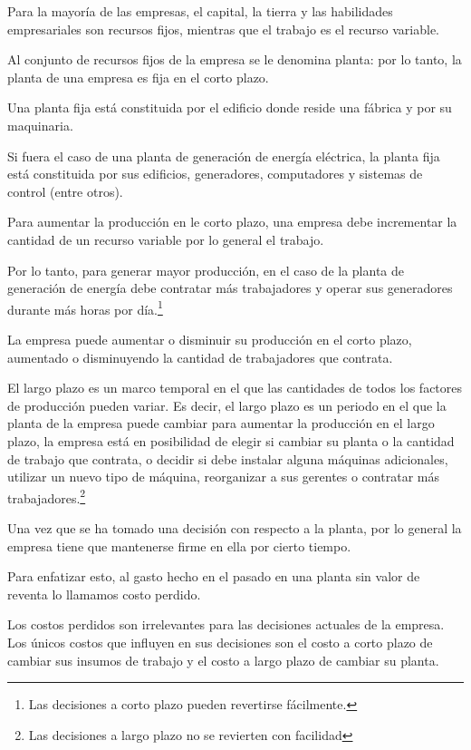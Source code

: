 Para la mayoría de las empresas, el capital, la tierra y las habilidades empresariales son recursos fijos, mientras que el trabajo es el recurso variable.

Al conjunto de recursos fijos de la empresa se le denomina planta: por lo tanto, la planta de una empresa es fija en el corto plazo.

\begin{example}
Una planta fija está constituida por el edificio donde reside una fábrica y por su maquinaria.

Si fuera el caso de una planta de generación de energía eléctrica, la planta fija está constituida por sus edificios, generadores, computadores y sistemas de control (entre otros).

Para aumentar la producción en le corto plazo, una empresa debe incrementar la cantidad de un recurso variable por lo general el trabajo.
\end{example}
Por lo tanto, para generar mayor producción, en el caso de la planta de generación de energía debe contratar más trabajadores y operar sus generadores durante más horas por día.\footnote{Las decisiones a corto plazo pueden revertirse fácilmente.}

La empresa puede aumentar o disminuir su producción en el corto plazo, aumentado o disminuyendo la cantidad de trabajadores que contrata.

El largo plazo es un marco temporal en el que las cantidades de todos los factores de producción pueden variar. Es decir, el largo plazo es un periodo en el que la planta de la empresa puede cambiar para aumentar la producción en el largo plazo, la empresa está en posibilidad de elegir si cambiar su planta o la cantidad de trabajo que contrata, o decidir si debe instalar alguna máquinas adicionales, utilizar un nuevo tipo de máquina, reorganizar a sus gerentes o contratar más trabajadores.\footnote{Las decisiones a largo plazo no se revierten con facilidad}

Una vez que se ha tomado una decisión con respecto a la planta, por lo general la empresa tiene que mantenerse firme en ella por cierto tiempo.

Para enfatizar esto, al gasto hecho en el pasado en una planta sin valor de reventa lo llamamos costo perdido.

Los costos perdidos son irrelevantes para las decisiones actuales de la empresa. Los únicos costos que influyen en sus decisiones son el costo a corto plazo de cambiar sus insumos de trabajo y el costo a largo plazo de cambiar su planta.

